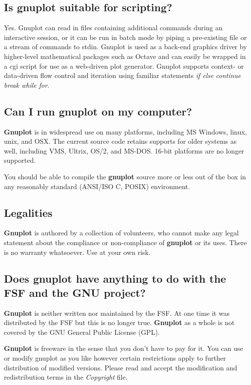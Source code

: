 \documentclass[a4paper,11pt]{article}
\newcommand{\gnuplot}{\textbf{gnuplot }}
\newcommand{\Gnuplot}{\textbf{Gnuplot }}
\begin{document}
\subsection{Is \gnuplot suitable for scripting?}

Yes. Gnuplot can read in files containing additional commands during
an interactive session, or it can be run in batch mode by piping a
pre-existing file or a stream of commands to stdin. Gnuplot is used
as a back-end graphics driver by higher-level mathematical packages 
such as Octave and can easily be wrapped in a cgi script for use as a 
web-driven plot generator.  Gnuplot supports context- or data-driven
flow control and iteration using familiar statements
{\em if else continue break while for}.


\subsection{Can I run \gnuplot on my computer?}

\Gnuplot{} is in widespread use on many platforms, including
MS Windows, linux, unix, and OSX.  The current source code retains
supports for older systems as well, including VMS, Ultrix, OS/2, and
MS-DOS. 16-bit platforms are no longer supported.

You should be able to compile the \gnuplot source more or
less out of the box in any reasonably standard (ANSI/ISO C, POSIX)
environment.


\subsection{Legalities}

\Gnuplot{} is authored by a collection of volunteers, who cannot
make any legal statement about the compliance or non-compliance of
\gnuplot or its uses. There is no warranty whatsoever. Use at your own risk.


\subsection{Does \gnuplot have anything to do with the FSF and the GNU
project?}

\Gnuplot{} is neither written nor maintained by the FSF\@. At one time it
was distributed by the FSF but this is no longer true. \Gnuplot{} as a whole
is not covered by the GNU General Public License (GPL).

\Gnuplot{} is freeware in the sense that you don't have to pay for it.
You can use or modify gnuplot as you like however certain restrictions
apply to further distribution of modified versions.
Please read and accept the modification and redistribution terms in
the \textit{Copyright} file.
\end{document}
